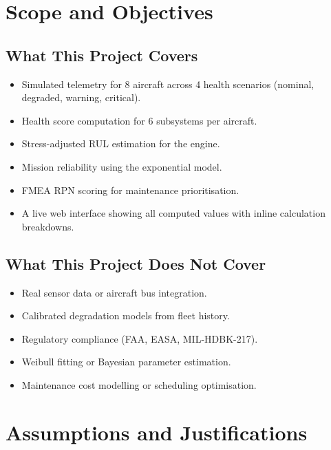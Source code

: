 \documentclass[11pt, a4paper]{report}
\begin{document}
\chapter{Scope and Objectives}

\section{What This Project Covers}

\begin{itemize}
  \item Simulated telemetry for 8 aircraft across 4 health scenarios
        (nominal, degraded, warning, critical).
  \item Health score computation for 6 subsystems per aircraft.
  \item Stress-adjusted RUL estimation for the engine.
  \item Mission reliability using the exponential model.
  \item FMEA RPN scoring for maintenance prioritisation.
  \item A live web interface showing all computed values with inline
        calculation breakdowns.
\end{itemize}

\section{What This Project Does Not Cover}

\begin{itemize}
  \item Real sensor data or aircraft bus integration.
  \item Calibrated degradation models from fleet history.
  \item Regulatory compliance (FAA, EASA, MIL-HDBK-217).
  \item Weibull fitting or Bayesian parameter estimation.
  \item Maintenance cost modelling or scheduling optimisation.
\end{itemize}

\chapter{Assumptions and Justifications}
\end{document}
